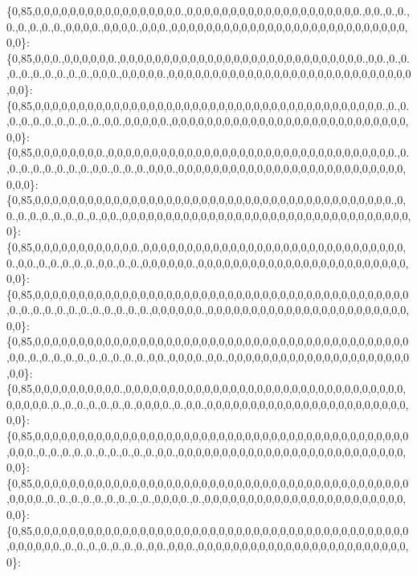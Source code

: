 \{0,85,0,0,0,0,0,0,0,0,0,0,0,0,0,0,0,0,0.,0,0,0,0,0,0,0,0,0,0,0,0,0,0,0,0,0,0,0,0.,0,0.,0.,0.,0.,0.,0.,0.,0.,0,0,0,0.,0,0,0,0.,0,0,0.,0,0,0,0,0,0,0,0,0,0,0,0,0,0,0,0,0,0,0,0,0,0,0,0,0,0,0,0,0\}\+: \{0,85,0,0,0.,0,0,0,0,0,0.,0,0,0,0,0,0,0,0,0,0,0,0,0,0,0,0,0,0,0,0,0,0,0,0,0,0,0,0.,0,0.,0.,0.,0.,0.,0.,0.,0.,0.,0.,0,0,0.,0,0,0,0,0.,0,0,0,0,0,0,0,0,0,0,0,0,0,0,0,0,0,0,0,0,0,0,0,0,0,0,0,0,0,0\}\+: \{0,85,0,0,0,0,0,0,0,0,0,0,0,0,0,0,0,0,0,0,0,0,0,0,0,0,0,0,0,0,0,0,0,0,0,0,0,0,0,0,0,0.,0.,0.,0.,0.,0.,0.,0.,0.,0.,0.,0,0.,0,0,0,0,0.,0,0,0,0,0,0,0,0,0,0,0,0,0,0,0,0,0,0,0,0,0,0,0,0,0,0,0,0,0\}\+: \{0,85,0,0,0,0,0,0,0,0.,0,0,0,0,0,0,0,0,0,0,0,0,0,0,0,0,0,0,0,0,0,0,0,0,0,0,0,0,0,0,0,0,0.,0.,0.,0.,0.,0.,0.,0.,0.,0,0.,0.,0.,0.,0,0,0.,0,0,0,0,0,0,0,0,0,0,0,0,0,0,0,0,0,0,0,0,0,0,0,0,0,0,0,0,0\}\+: \{0,85,0,0,0,0,0,0,0,0,0,0,0,0,0,0,0,0,0,0,0,0,0,0,0,0,0,0,0,0,0,0,0,0,0,0,0,0,0,0,0,0,0.,0,0.,0.,0.,0.,0.,0.,0.,0.,0,0.,0,0,0,0,0,0,0,0,0,0,0,0,0,0,0,0,0,0,0,0,0,0,0,0,0,0,0,0,0,0,0,0,0,0\}\+: \{0,85,0,0,0,0,0,0,0,0,0,0,0,0.,0,0,0,0,0,0,0,0,0,0,0,0,0,0,0,0,0,0,0,0,0,0,0,0,0,0,0,0,0,0,0.,0,0.,0.,0.,0.,0.,0.,0,0.,0.,0.,0,0,0,0,0,0.,0,0,0,0,0,0,0,0,0,0,0,0,0,0,0,0,0,0,0,0,0,0,0,0,0,0\}\+: \{0,85,0,0,0,0,0,0,0,0,0,0,0,0,0,0,0,0,0,0,0,0,0,0,0,0,0,0,0,0,0,0,0,0,0,0,0,0,0,0,0,0,0,0,0,0.,0.,0.,0.,0.,0.,0.,0.,0.,0.,0.,0.,0,0,0,0,0,0.,0,0,0,0,0,0,0,0,0,0,0,0,0,0,0,0,0,0,0,0,0,0,0,0,0\}\+: \{0,85,0,0,0,0,0,0,0,0,0,0,0,0,0,0,0,0,0,0,0,0,0,0,0,0,0,0,0,0,0,0,0,0,0,0,0,0,0,0,0,0,0,0,0,0,0.,0.,0.,0.,0.,0.,0.,0.,0.,0.,0.,0,0.,0,0,0,0.,0,0.,0,0,0,0,0,0,0,0,0,0,0,0,0,0,0,0,0,0,0,0,0,0,0\}\+: \{0,85,0,0,0,0,0,0,0,0,0,0.,0,0,0,0,0,0,0,0,0,0,0,0,0,0,0,0,0,0,0,0,0,0,0,0,0,0,0,0,0,0,0,0,0,0,0,0,0.,0.,0.,0.,0.,0.,0.,0.,0,0,0,0.,0.,0,0.,0,0,0,0,0,0,0,0,0,0,0,0,0,0,0,0,0,0,0,0,0,0,0,0,0\}\+: \{0,85,0,0,0,0,0,0,0,0,0,0,0,0,0,0,0,0,0,0,0,0,0,0,0,0,0,0,0,0,0,0,0,0,0,0,0,0,0,0,0,0,0,0,0,0,0,0.,0.,0.,0.,0.,0.,0.,0.,0.,0.,0.,0,0.,0,0,0,0,0,0,0,0,0,0,0,0,0,0,0,0,0,0,0,0,0,0,0,0,0,0,0,0\}\+: \{0,85,0,0,0,0,0,0,0,0,0,0,0,0,0,0,0,0,0,0,0,0,0,0,0,0,0,0,0,0,0,0,0,0,0,0,0,0,0,0,0,0,0,0,0,0,0,0,0.,0.,0.,0.,0.,0.,0.,0.,0.,0.,0,0,0,0.,0.,0,0,0,0,0,0,0,0,0,0,0,0,0,0,0,0,0,0,0,0,0,0,0,0,0\}\+: \{0,85,0,0,0,0,0,0,0,0,0,0,0,0,0,0,0,0,0,0,0,0,0,0,0,0,0,0,0,0,0,0,0,0,0,0,0,0,0,0,0,0,0,0,0,0,0,0,0,0,0.,0.,0.,0.,0.,0.,0.,0.,0,0.,0,0,0.,0,0,0,0,0,0,0,0,0,0,0,0,0,0,0,0,0,0,0,0,0,0,0,0,0\}\+: 